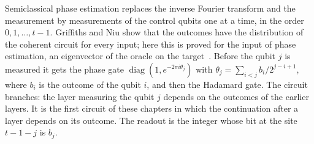 \begin{definition}
    \label{def:phase_estimation_semiclassical}
    \leanok
    Semiclassical phase estimation \cite{GriffithsNiu1996} replaces the inverse Fourier
    transform and the measurement by measurements of the control qubits one at a time,
    in the order $0,1,\dots,t-1$. Griffiths and Niu show that the outcomes have the
    distribution of the coherent circuit for every input; here this is proved for the
    input of phase estimation, an eigenvector of the oracle on the
    target~\cite{gap:gn96_semiclassical_general_input_scope}. Before the qubit $j$ is measured it
    gets the phase
    gate $\operatorname{diag}(1,e^{-2\pi i\theta_j})$ with
    $\theta_j=\sum_{i<j}b_i/2^{j-i+1}$, where $b_i$ is the outcome of the qubit $i$,
    and then the Hadamard gate. The circuit branches: the layer measuring the qubit $j$
    depends on the outcomes of the earlier layers. It is the first circuit of these
    chapters in which the continuation after a layer depends on its outcome. The
    readout is the integer whose bit at the site $t-1-j$ is $b_j$.
\end{definition}

